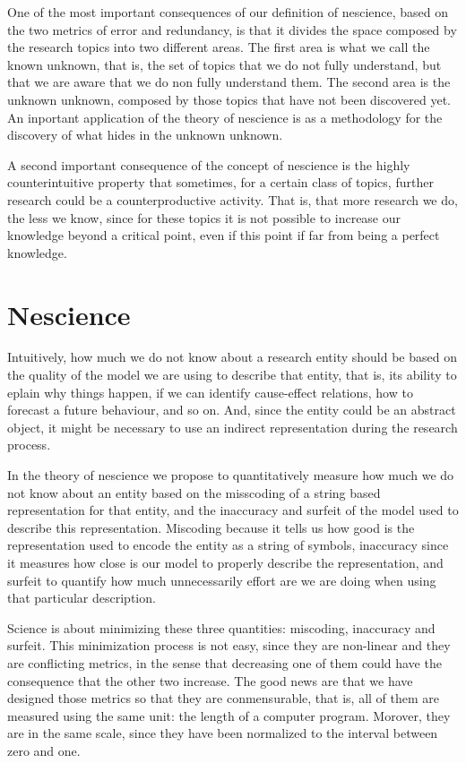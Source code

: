 One of the most important consequences of our definition of nescience, based on the two metrics of error and redundancy, is that it divides the space composed by the research topics into two different areas. The first area is what we call the known unknown, that is, the set of topics that we do not fully understand, but that we are aware that we do non fully understand them. The second area is the unknown unknown, composed by those topics that have not been discovered yet. An inportant application of the theory of nescience is as a methodology for the discovery of what hides in the unknown unknown.

A second important consequence of the concept of nescience is the highly counterintuitive property that sometimes, for a certain class of topics, further research could be a counterproductive activity. That is, that more research we do, the less we know, since for these topics it is not possible to increase our knowledge beyond a critical point, even if this point if far from being a perfect knowledge.

%
%

\section{Nescience}

Intuitively, how much we do not know about a research entity should be based on the quality of the model we are using to describe that entity, that is, its ability to eplain why things happen, if we can identify cause-effect relations, how to forecast a future behaviour, and so on. And, since the entity could be an abstract object, it might be necessary to use an indirect representation during the research process.

In the theory of nescience we propose to quantitatively measure how much we do not know about an entity based on the misscoding of a string based representation for that entity, and the inaccuracy and surfeit of the model used to describe this representation. Miscoding because it tells us how good is the representation used to encode the entity as a string of symbols, inaccuracy since it measures how close is our model to properly describe the representation, and surfeit to quantify how much unnecessarily effort are we are doing when using that particular description.

Science is about minimizing these three quantities: miscoding, inaccuracy and surfeit. This minimization process is not easy, since they are non-linear and they are conflicting metrics, in the sense that decreasing one of them could have the consequence that the other two increase. The good news are that we have designed those metrics so that they are conmensurable, that is, all of them are measured using the same unit: the length of a computer program. Morover, they are in the same scale, since they have been normalized to the interval between zero and one.

